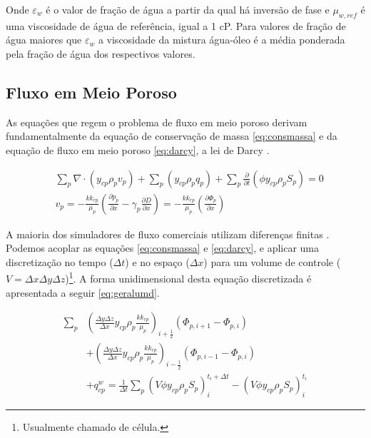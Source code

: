 \documentclass[final,5p]{elsarticle}
\numberwithin{equation}{section}
\begin{document}
        Onde $\varepsilon_w$ é o valor de fração de água a partir da qual há inversão de fase e $\mu_{w,ref}$ é uma viscosidade de água de referência, igual a 1 cP. Para valores de fração de água maiores que $\varepsilon_w$ a viscosidade da mistura água-óleo é a média ponderada pela fração de água dos respectivos valores.

    \subsection{Fluxo em Meio Poroso}

        As equações que regem o problema de fluxo em meio poroso derivam fundamentalmente da equação de conservação de massa \ref{eq:consmassa} e da equação de fluxo em meio poroso \ref{eq:darcy}, a lei de Darcy \cite{dake1983fundamentals}.

        \begin{align}
            &\sum_{p} \nabla \cdot  (y_{cp} \rho_p v_p) + \sum_{p} (y_{cp} \rho_p q_p) + \sum_{p} \frac{\partial}{\partial t} \left( \phi y_{cp} \rho_p S_p\right) = 0 \label{eq:consmassa} \\
            &v_p = - \frac{k k_{rp}}{\mu_p} \left( \frac{\partial p_p}{\partial x} - \gamma_p \frac{\partial D}{\partial x} \right) = - \frac{k k_{rp}}{\mu_p} \left( \frac{\partial \Phi_p}{\partial x} \right)\label{eq:darcy}
        \end{align}

        A maioria dos simuladores de fluxo comerciais utilizam diferenças finitas \cite{computer2022cmg}\cite{schlumberger2009technical}. Podemos acoplar as equações \ref{eq:consmassa} e \ref{eq:darcy}, e aplicar uma discretização no tempo ($\Delta t$) e no espaço ($\Delta x$) para um volume de controle ($V = \Delta x \Delta y \Delta z$)\footnote{Usualmente chamado de célula.}. A forma unidimensional desta equação discretizada é apresentada a seguir \ref{eq:geralumd}.

        \begin{align}
            \sum_{p} & \left( \frac{\Delta y \Delta z}{\Delta x} y_{cp} \rho_p \frac{k k_{rp}}{\mu_p} \right)_{i+\tfrac{1}{2}} (\Phi_{p,i+1} - \Phi_{p,i})  \nonumber \\
            & + \left( \frac{\Delta y \Delta z}{\Delta x} y_{cp} \rho_p \frac{k k_{rp}}{\mu_p} \right)_{i-\tfrac{1}{2}} (\Phi_{p,i-1} - \Phi_{p,i}) \nonumber \\
            & + q_{cp}^{w} = \frac{1}{\Delta t} \sum_{p} (V \phi y_{cp} \rho_p S_p)_i^{t_i+\Delta t} - (V \phi y_{cp} \rho_p S_p)_i^{t_i} \label{eq:geralumd}
        \end{align}
\end{document}
